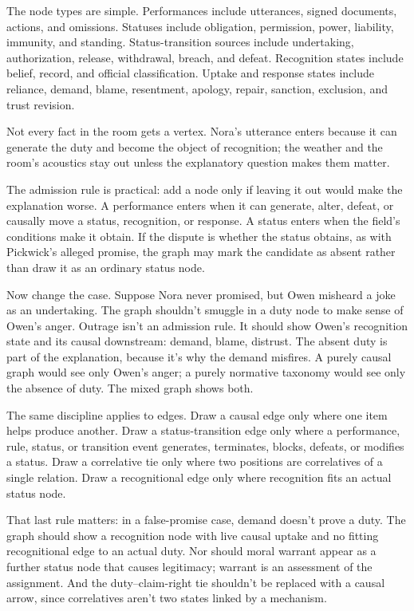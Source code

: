 \documentclass[12pt]{article}
\begin{document}
The node types are simple. Performances include utterances, signed documents, actions, and omissions. Statuses include obligation, permission, power, liability, immunity, and standing. Status-transition sources include undertaking, authorization, release, withdrawal, breach, and defeat. Recognition states include belief, record, and official classification. Uptake and response states include reliance, demand, blame, resentment, apology, repair, sanction, exclusion, and trust revision.

Not every fact in the room gets a vertex. Nora's utterance enters because it can generate the duty and become the object of recognition; the weather and the room's acoustics stay out unless the explanatory question makes them matter.

The admission rule is practical: add a node only if leaving it out would make the explanation worse. A performance enters when it can generate, alter, defeat, or causally move a status, recognition, or response. A status enters when the field's conditions make it obtain. If the dispute is whether the status obtains, as with Pickwick's alleged promise, the graph may mark the candidate as absent rather than draw it as an ordinary status node.

Now change the case. Suppose Nora never promised, but Owen misheard a joke as an undertaking. The graph shouldn't smuggle in a duty node to make sense of Owen's anger. Outrage isn't an admission rule. It should show Owen's recognition state and its causal downstream: demand, blame, distrust. The absent duty is part of the explanation, because it's why the demand misfires. A purely causal graph would see only Owen's anger; a purely normative taxonomy would see only the absence of duty. The mixed graph shows both.

The same discipline applies to edges. Draw a causal edge only where one item helps produce another. Draw a status-transition edge only where a performance, rule, status, or transition event generates, terminates, blocks, defeats, or modifies a status. Draw a correlative tie only where two positions are correlatives of a single relation. Draw a recognitional edge only where recognition fits an actual status node.

That last rule matters: in a false-promise case, demand doesn't prove a duty. The graph should show a recognition node with live causal uptake and no fitting recognitional edge to an actual duty. Nor should moral warrant appear as a further status node that causes legitimacy; warrant is an assessment of the assignment. And the duty--claim-right tie shouldn't be replaced with a causal arrow, since correlatives aren't two states linked by a mechanism.
\end{document}
